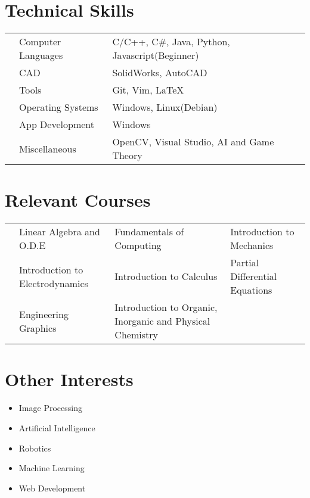 \documentclass[11pt,a4paper]{moderncv}
\begin{document}
  \section{Technical Skills}
    \begin{tabular}{L{0.05cm} L{4cm} l}
      & Computer Languages   & C/C++, C\#, Java, Python, Javascript(Beginner)\vspace{2mm}\\
      & CAD                  & SolidWorks, AutoCAD \vspace{2mm}\\
      & Tools                & Git, Vim, \LaTeX \vspace{2mm}\\
      & Operating Systems    & Windows, Linux(Debian)\vspace{2mm}\\
      & App Development      & Windows \vspace{2mm}\\
      & Miscellaneous        & OpenCV, Visual Studio, AI and Game Theory\vspace{2mm}
    \end{tabular}
  \section{Relevant Courses}
    \begin{tabular}{L{0.05cm} L{6cm} L{5.5cm} L{5.5cm}}
      & Linear Algebra and O.D.E        & Fundamentals of Computing & Introduction to Mechanics\vspace{2mm}\\
      & Introduction to Electrodynamics & Introduction to Calculus  & Partial Differential Equations\vspace{2mm}\\
      & Engineering Graphics            & Introduction to Organic, Inorganic and Physical Chemistry
    \end{tabular}
  \section{Other Interests}
    \begin {itemize}
  \item Image Processing\vspace{2mm}
      \item Artificial Intelligence\vspace{2mm}
      \item Robotics\vspace{2mm}
      \item Machine Learning\vspace{2mm}
      \item Web Development\vspace{2mm}
    \end{itemize}
\end{document}
